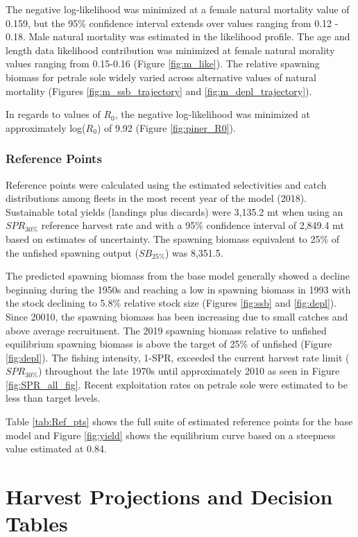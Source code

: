 \documentclass[12pt,]{article}
\begin{document}
The negative log-likelihood was minimized at a female natural mortality
value of 0.159, but the 95\% confidence interval extends over values
ranging from 0.12 - 0.18. Male natural mortality was estimated in the
likelihood profile. The age and length data likelihood contribution was
minimized at female natural morality values ranging from 0.15-0.16
(Figure \ref{fig:m_like}). The relative spawning biomass for petrale
sole widely varied across alternative values of natural mortality
(Figures \ref{fig:m_ssb_trajectory} and \ref{fig:m_depl_trajectory}).

In regards to values of \(R_0\), the negative log-likelihood was
minimized at approximately log(\(R_0\)) of 9.92 (Figure
\ref{fig:piner_R0}).

\subsubsection{Reference Points}\label{reference-points-1}

Reference points were calculated using the estimated selectivities and
catch distributions among fleets in the most recent year of the model
(2018). Sustainable total yields (landings plus discards) were 3,135.2
mt when using an \(SPR_{30\%}\) reference harvest rate and with a 95\%
confidence interval of 2,849.4 mt based on estimates of uncertainty. The
spawning biomass equivalent to 25\% of the unfished spawning output
(\(SB_{25\%}\)) was 8,351.5.

The predicted spawning biomass from the base model generally showed a
decline beginning during the 1950s and reaching a low in spawning
biomass in 1993 with the stock declining to 5.8\% relative stock size
(Figures \ref{fig:ssb} and \ref{fig:depl}). Since 20010, the spawning
biomass has been increasing due to small catches and above average
recruitment. The 2019 spawning biomass relative to unfished equilibrium
spawning biomass is above the target of 25\% of unfished (Figure
\ref{fig:depl}). The fishing intensity, 1-SPR, exceeded the current
harvest rate limit (\(SPR_{30\%}\)) throughout the late 1970s until
approximately 2010 as seen in Figure \ref{fig:SPR_all_fig}. Recent
exploitation rates on petrale sole were estimated to be less than target
levels.

Table \ref{tab:Ref_pts} shows the full suite of estimated reference
points for the base model and Figure \ref{fig:yield} shows the
equilibrium curve based on a steepness value estimated at 0.84.

\section{Harvest Projections and Decision
Tables}\label{harvest-projections-and-decision-tables}
\end{document}
